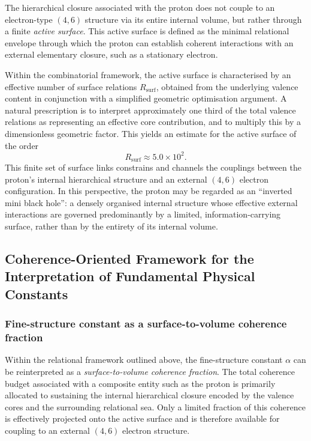 \documentclass[11pt,a4paper]{article}
\begin{document}
The hierarchical closure associated with the proton does not couple to an electron-type \((4,6)\) structure via its entire internal volume, but rather through a finite \emph{active surface}. This active surface is defined as the minimal relational envelope through which the proton can establish coherent interactions with an external elementary closure, such as a stationary electron.

Within the combinatorial framework, the active surface is characterised by an effective number of surface relations \(R_{\mathrm{surf}}\), obtained from the underlying valence content in conjunction with a simplified geometric optimisation argument. A natural prescription is to interpret approximately one third of the total valence relations as representing an effective core contribution, and to multiply this by a dimensionless geometric factor. This yields an estimate for the active surface of the order
\[
  R_{\mathrm{surf}} \approx 5.0 \times 10^2.
\]
This finite set of surface links constrains and channels the couplings between the proton’s internal hierarchical structure and an external \((4,6)\) electron configuration. In this perspective, the proton may be regarded as an “inverted mini black hole”: a densely organised internal structure whose effective external interactions are governed predominantly by a limited, information-carrying surface, rather than by the entirety of its internal volume.

\subsection{Coherence-Oriented Framework for the Interpretation of Fundamental Physical Constants}

\subsubsection{Fine-structure constant as a surface-to-volume coherence fraction}

Within the relational framework outlined above, the fine-structure constant \(\alpha\) can be reinterpreted as a \emph{surface-to-volume coherence fraction}. The total coherence budget associated with a composite entity such as the proton is primarily allocated to sustaining the internal hierarchical closure encoded by the valence cores and the surrounding relational sea. Only a limited fraction of this coherence is effectively projected onto the active surface and is therefore available for coupling to an external \((4,6)\) electron structure.
\end{document}
